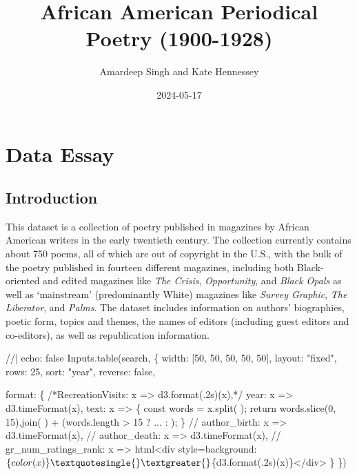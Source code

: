 \documentclass[
  letterpaper,
  DIV=11,
  numbers=noendperiod]{scrartcl}
\title{African American Periodical Poetry (1900-1928)}
\author{Amardeep Singh and Kate Hennessey}
\date{2024-05-17}
\newenvironment{Shaded}{\begin{snugshade}}{\end{snugshade}}
\newcommand{\NormalTok}[1]{\textcolor[rgb]{0.00,0.23,0.31}{#1}}
\renewcommand*\contentsname{Table of contents}
\newcommand\contentsname{Table of contents}
\begin{document}
\maketitle

\renewcommand*\contentsname{Table of contents}
{
\hypersetup{linkcolor=}
\setcounter{tocdepth}{5}
\tableofcontents
}
\section{Data Essay}

\subsection{Introduction}\label{introduction}

This dataset is a collection of poetry published in magazines by African
American writers in the early twentieth century. The collection
currently contains about 750 poems, all of which are out of copyright in
the U.S., with the bulk of the poetry published in fourteen different
magazines, including both Black-oriented and edited magazines like
\emph{The Crisis}, \emph{Opportunity}, and \emph{Black Opals} as well as
`mainstream' (predominantly White) magazines like \emph{Survey Graphic},
\emph{The Liberator}, and \emph{Palms}. The dataset includes information
on authors' biographies, poetic form, topics and themes, the names of
editors (including guest editors and co-editors), as well as
republication information.

\begin{Shaded}
\begin{Highlighting}[]
\NormalTok{//| echo: false}
\NormalTok{Inputs.table(search, \{}
\NormalTok{   width: [50, 50, 50, 50, 50],}
\NormalTok{  layout: "fixed",}
\NormalTok{  rows: 25,}
\NormalTok{  sort: "year",}
\NormalTok{  reverse: false,}

\NormalTok{  format: \{}
\NormalTok{    /*RecreationVisits: x =\textgreater{} d3.format(\textquotesingle{}.2s\textquotesingle{})(x),*/}
\NormalTok{    year: x =\textgreater{} d3.timeFormat(x),}
\NormalTok{    text: x =\textgreater{} \{}
\NormalTok{      const words = x.split(\textquotesingle{} \textquotesingle{});}
\NormalTok{      return words.slice(0, 15).join(\textquotesingle{} \textquotesingle{}) + (words.length \textgreater{} 15 ? \textquotesingle{}...\textquotesingle{} : \textquotesingle{}\textquotesingle{});}
\NormalTok{    \}}
\NormalTok{    // author\_birth: x =\textgreater{} d3.timeFormat(x),}
\NormalTok{    // author\_death: x =\textgreater{} d3.timeFormat(x),}
\NormalTok{    // gr\_num\_ratings\_rank: x =\textgreater{} html\textasciigrave{}\textless{}div style=\textquotesingle{}background:$\{color(x)\}\textquotesingle{}\textgreater{}$\{d3.format(\textquotesingle{}.2s\textquotesingle{})(x)\}\textless{}/div\textgreater{}\textasciigrave{}}
\NormalTok{  \}}
\NormalTok{\})}
\end{Highlighting}
\end{Shaded}
\end{document}
